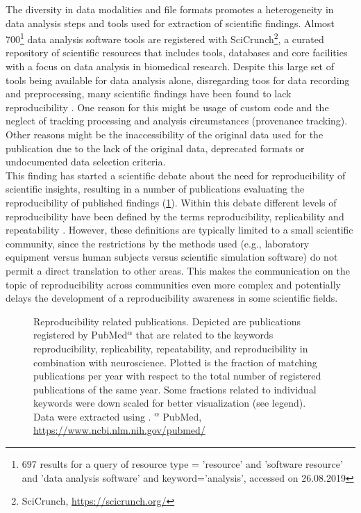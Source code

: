 The diversity in data modalities and file formats promotes a heterogeneity in data analysis steps and tools used for extraction of scientific findings. Almost 700\footnote{697 results for a query of resource type = 'resource' and 'software resource' and 'data analysis software' and keyword='analysis', accessed on 26.08.2019} data analysis software tools are registered with SciCrunch\footnote{SciCrunch, \url{https://scicrunch.org/}}, a curated repository of scientific resources that includes tools, databases and core facilities with a focus on data analysis in biomedical research. Despite this large set of tools being available for data analysis alone, disregarding toos for data recording and preprocessing, many scientific findings have been found to lack reproducibility \citep{Ioannidis_2005,Ioannidis_2007,Baker_2016,Eisner_2018}. One reason for this might be usage of custom code and the neglect of tracking processing and analysis circumstances (provenance tracking). Other reasons might be the inaccessibility of the original data used for the publication due to the lack of the original data, deprecated formats or undocumented data selection criteria.\\

This finding has started a scientific debate about the need for reproducibility of scientific insights, resulting in a number of publications evaluating the reproducibility of published findings (\cref{fig:intro_reproducibility}). Within this debate different levels of reproducibility have been defined by the terms reproducibility, replicability and repeatability \citep{Plesser_2018}. However, these definitions are typically limited to a small scientific community, since the restrictions by the methods used (e.g., laboratory equipment versus human subjects versus scientific simulation software) do not permit a direct translation to other areas. This makes the communication on the topic of reproducibility across communities even more complex and potentially delays the development of a reproducibility awareness in some scientific fields.\\


\begin{figure}[h!]
 \centering
 
 \caption[Reproducibility related publications]{Reproducibility related publications. Depicted  are publications registered by PubMed\textsuperscript{$\alpha$} that are related to the keywords reproducibility, replicability, repeatability, and reproducibility in combination with neuroscience. Plotted is the fraction of matching publications per year with respect to the total number of registered publications of the same year. Some fractions related to individual keywords were down scaled for better visualization (see legend). Data were extracted using \citet{Corlan_2004}. \small\textsuperscript{$\alpha$} PubMed, \url{https://www.ncbi.nlm.nih.gov/pubmed/}}
 \label{fig:intro_reproducibility}
\end{figure}

